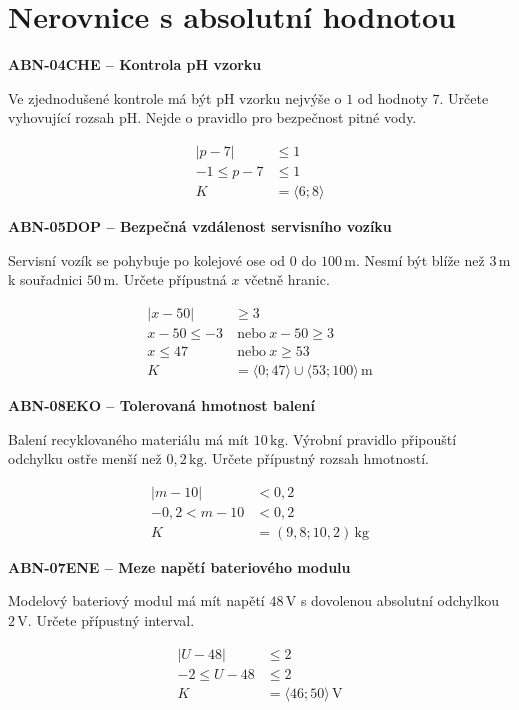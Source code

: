 \documentclass[11pt,a4paper]{article}
\begin{document}
\section{Nerovnice s absolutní hodnotou}
\par\medskip\noindent
\textbf{ABN-04}\quad\textbf{CHE -- Kontrola pH vzorku}\par
Ve zjednodušené kontrole má být pH vzorku nejvýše o $1$ od hodnoty $7$. Určete vyhovující rozsah pH. Nejde o pravidlo pro bezpečnost pitné vody.
\par\[\begin{aligned}
|p-7|&\le1\\-1\le p-7&\le1\\K&=\langle6;8\rangle
\end{aligned}\]
\par\medskip\noindent
\textbf{ABN-05}\quad\textbf{DOP -- Bezpečná vzdálenost servisního vozíku}\par
Servisní vozík se pohybuje po kolejové ose od $0$ do $100\,\mathrm m$. Nesmí být blíže než $3\,\mathrm m$ k souřadnici $50\,\mathrm m$. Určete přípustná $x$ včetně hranic.
\par\[\begin{aligned}
|x-50|&\ge3\\x-50\le-3&\ \text{nebo}\ x-50\ge3\\x\le47&\ \text{nebo}\ x\ge53\\K&=\langle0;47\rangle\cup\langle53;100\rangle\,\mathrm m
\end{aligned}\]
\par\medskip\noindent
\textbf{ABN-08}\quad\textbf{EKO -- Tolerovaná hmotnost balení}\par
Balení recyklovaného materiálu má mít $10\,\mathrm{kg}$. Výrobní pravidlo připouští odchylku ostře menší než $0{,}2\,\mathrm{kg}$. Určete přípustný rozsah hmotností.
\par\[\begin{aligned}
|m-10|&<0{,}2\\-0{,}2<m-10&<0{,}2\\K&=(9{,}8;10{,}2)\,\mathrm{kg}
\end{aligned}\]
\par\medskip\noindent
\textbf{ABN-07}\quad\textbf{ENE -- Meze napětí bateriového modulu}\par
Modelový bateriový modul má mít napětí $48\,\mathrm V$ s dovolenou absolutní odchylkou $2\,\mathrm V$. Určete přípustný interval.
\par\[\begin{aligned}
|U-48|&\le2\\-2\le U-48&\le2\\K&=\langle46;50\rangle\,\mathrm V
\end{aligned}\]
\end{document}
